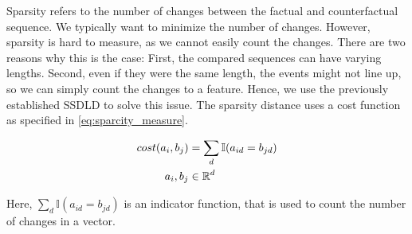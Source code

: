 \documentclass[./../../paper.tex]{subfiles}
\begin{document}
Sparsity refers to the number of changes between the factual and counterfactual sequence. We typically want to minimize the number of changes. However, sparsity is hard to measure, as we cannot easily count the changes. There are two reasons why this is the case: First, the compared sequences can have varying lengths. Second, even if they were the same length, the events might not line up, so we can simply count the changes to a feature. Hence, we use the previously established \gls{SSDLD} to solve this issue. The sparsity distance uses a cost function as specified in \autoref{eq:sparcity_measure}.

\begin{align}
    \label{eq:sparcity_measure}                          
    cost(a_i, b_j)      & = \sum_d \mathbb{I}(a_{id} = b_{jd})  \\ 
    a_i,b_j        & \in \mathbb{R}^d \nonumber 
\end{align}

\noindent Here, $\sum_d \mathbb{I}(a_{id} = b_{jd})$ is an indicator function, that is used to count the number of changes in a vector. 





        


        
        

        
\end{document}

